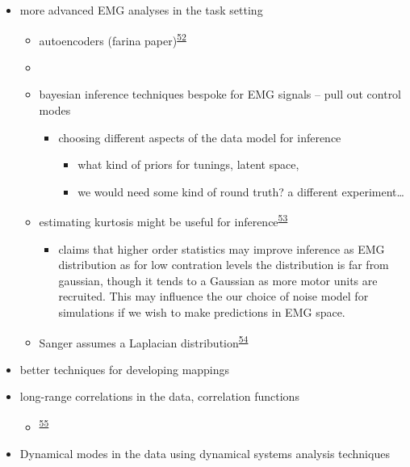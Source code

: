\documentclass[
  a4paper,
]{article}
\providecommand{\tightlist}{%
  \setlength{\itemsep}{0pt}\setlength{\parskip}{0pt}}
\begin{document}
\begin{itemize}
\item
  more advanced EMG analyses in the task setting

  \begin{itemize}
  \tightlist
  \item
    autoencoders (farina
    paper)\textsuperscript{\protect\hyperlink{ref-vujaklijaOnlineMappingEMG2018}{52}}
  \item
  \item
    bayesian inference techniques bespoke for EMG signals -- pull out
    control modes

    \begin{itemize}
    \tightlist
    \item
      choosing different aspects of the data model for inference

      \begin{itemize}
      \tightlist
      \item
        what kind of priors for tunings, latent space,
      \item
        we would need some kind of round truth? a different
        experiment\ldots{}
      \end{itemize}
    \end{itemize}
  \item
    estimating kurtosis might be useful for
    inference\textsuperscript{\protect\hyperlink{ref-nazarpourNoteProbabilityDistribution2013}{53}}

    \begin{itemize}
    \tightlist
    \item
      claims that higher order statistics may improve inference as EMG
      distribution as for low contration levels the distribution is far
      from gaussian, though it tends to a Gaussian as more motor units
      are recruited. This may influence the our choice of noise model
      for simulations if we wish to make predictions in EMG space.
    \end{itemize}
  \item
    Sanger assumes a Laplacian
    distribution\textsuperscript{\protect\hyperlink{ref-sangerBayesianFilteringMyoelectric2007}{54}}
  \end{itemize}
\item
  better techniques for developing mappings
\item
  long-range correlations in the data, correlation functions

  \begin{itemize}
  \tightlist
  \item
    \textsuperscript{\protect\hyperlink{ref-crevecoeurGoldstandardApproachAddress2010}{55}}
  \end{itemize}
\item
  Dynamical modes in the data using dynamical systems analysis
  techniques
\end{itemize}
\end{document}
